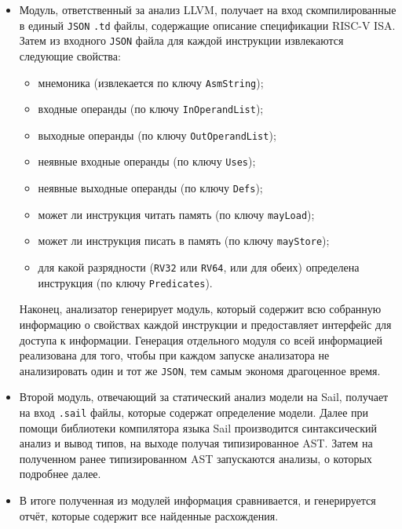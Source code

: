 \begin{itemize}
  \item Модуль, ответственный за анализ LLVM, получает на вход скомпилированные в единый \texttt{JSON} \texttt{.td} файлы, содержащие описание спецификации RISC-V ISA.
        Затем из входного \texttt{JSON} файла для каждой инструкции извлекаются следующие свойства:
        \begin{itemize}
          \item мнемоника (извлекается по ключу \texttt{AsmString});
          \item входные операнды (по ключу \texttt{InOperandList});
          \item выходные операнды (по ключу \texttt{OutOperandList});
          \item неявные входные операнды (по ключу \texttt{Uses});
          \item неявные выходные операнды (по ключу \texttt{Defs});
          \item может ли инструкция читать память (по ключу \texttt{mayLoad});
          \item может ли инструкция писать в память (по ключу \texttt{mayStore});
          \item для какой разрядности (\texttt{RV32} или \texttt{RV64}, или для обеих) определена инструкция (по ключу \texttt{Predicates}).
        \end{itemize}
        Наконец, анализатор генерирует модуль, который содержит всю собранную информацию о свойствах каждой инструкции и предоставляет интерфейс для доступа к информации.
        Генерация отдельного модуля со всей информацией реализована для того, чтобы при каждом запуске анализатора не анализировать один и тот же \texttt{JSON}, тем самым экономя драгоценное время.

  \item Второй модуль, отвечающий за статический анализ модели на Sail, получает на вход \texttt{.sail} файлы, которые содержат определение модели.
        Далее при помощи библиотеки компилятора языка Sail производится синтаксический анализ и вывод типов, на выходе получая типизированное AST.
        Затем на полученном ранее типизированном AST запускаются анализы, о которых подробнее далее.

  \item В итоге полученная из модулей информация сравнивается, и генерируется отчёт, которые содержит все найденные расхождения.
\end{itemize}

